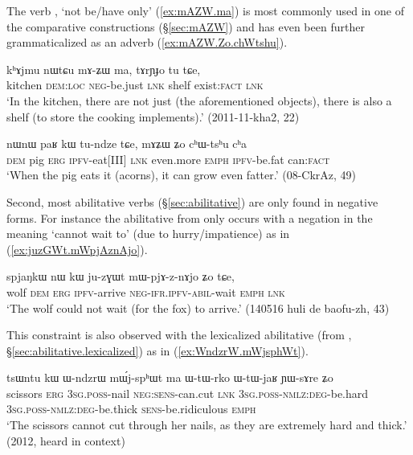 The verb , `not be/have only' (\ref{ex:mAZW.ma}) is most commonly used in one of the comparative constructions  (§\ref{sec:mAZW}) and has even been further grammaticalized as an adverb  (\ref{ex:mAZW.Zo.chWtshu}).

\begin{exe}
	\ex \label{ex:mAZW.ma}
	\gll kʰɤjmu nɯtɕu mɤ-ʑɯ ma, tɤrɲɟo tu tɕe, \\
	kitchen \textsc{dem}:\textsc{loc} \textsc{neg}-be.just \textsc{lnk} shelf exist:\textsc{fact} \textsc{lnk} \\
	\glt `In the kitchen, there are not just (the aforementioned objects), there is also a shelf (to store the cooking implements).' (2011-11-kha2, 22)
\end{exe}

\begin{exe}
	\ex \label{ex:mAZW.Zo.chWtshu}
	\gll nɯnɯ paʁ kɯ tu-ndze tɕe, mɤʑɯ ʑo cʰɯ-tsʰu cʰa \\
	\textsc{dem} pig \textsc{erg} \textsc{ipfv}-eat[III] \textsc{lnk} even.more \textsc{emph} \textsc{ipfv}-be.fat can:\textsc{fact} \\
	\glt `When the pig eats it (acorns), it can grow even fatter.' (08-CkrAz, 49)
\end{exe}

Second, most  abilitative verbs (§\ref{sec:abilitative}) are only found in negative forms. For instance the abilitative  from  only occurs with a negation in the meaning `cannot wait to' (due to hurry/impatience) as in (\ref{ex:juzGWt.mWpjAznAjo}).

\begin{exe}
	\ex \label{ex:juzGWt.mWpjAznAjo}
	\gll  spjaŋkɯ nɯ kɯ  ju-zɣɯt mɯ-pjɤ-z-nɤjo ʑo tɕe, \\
	wolf \textsc{dem} \textsc{erg} \textsc{ipfv}-arrive \textsc{neg}-\textsc{ifr}.\textsc{ipfv}-\textsc{abil}-wait \textsc{emph} \textsc{lnk} \\
	\glt `The wolf could not wait (for the fox) to arrive.' (140516 huli de baofu-zh, 43)
\end{exe}

This constraint is also observed with the lexicalized abilitative  (from , §\ref {sec:abilitative.lexicalized}) as in (\ref{ex:WndzrW.mWjsphWt}).

\begin{exe}
	\ex \label{ex:WndzrW.mWjsphWt}
	\gll tsɯntu kɯ ɯ-ndzrɯ mɯ́j-spʰɯt ma ɯ-tɯ-rko ɯ-tɯ-jaʁ ɲɯ-sɤre ʑo \\
	scissors \textsc{erg} \textsc{3sg}.\textsc{poss}-nail \textsc{neg}:\textsc{sens}-can.cut \textsc{lnk} \textsc{3sg}.\textsc{poss}-\textsc{nmlz}:\textsc{deg}-be.hard \textsc{3sg}.\textsc{poss}-\textsc{nmlz}:\textsc{deg}-be.thick \textsc{sens}-be.ridiculous \textsc{emph} \\
	\glt `The scissors cannot cut through her nails, as they are extremely hard and thick.' (2012, heard in context) 
\end{exe}


